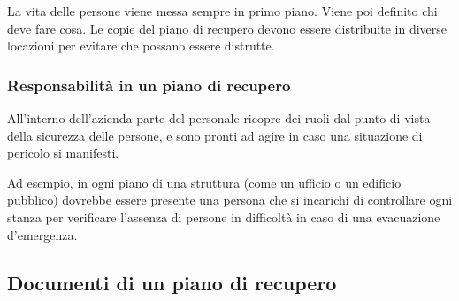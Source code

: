 La vita delle persone viene messa sempre in primo piano. Viene poi definito chi 
deve fare cosa. Le copie del piano di recupero devono essere distribuite in 
diverse locazioni per evitare che possano essere distrutte.

\subsubsection{Responsabilità in un piano di recupero}

All'interno dell'azienda parte del personale ricopre dei ruoli dal punto di 
vista della sicurezza delle persone, e sono pronti ad agire in caso una 
situazione di pericolo si manifesti.

Ad esempio, in ogni piano di una struttura (come un ufficio o un edificio 
pubblico) dovrebbe essere presente una persona che si incarichi di controllare 
ogni stanza per verificare l'assenza di persone in difficoltà in caso di una 
evacuazione d'emergenza.

\subsection{Documenti di un piano di recupero}


